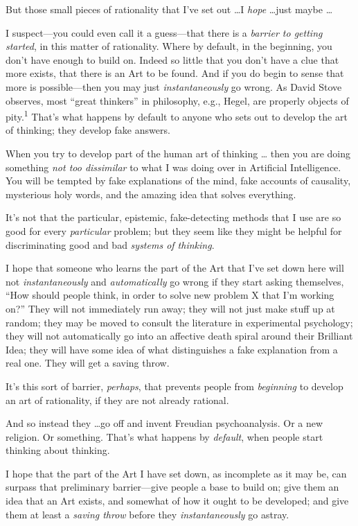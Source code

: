 {
 But those small pieces of rationality that I've
set out \ldots I \textit{hope} \ldots just maybe \ldots}

{
 I suspect---you could even call it a guess---that there is a
\textit{barrier to getting started}, in this matter of rationality.
Where by default, in the beginning, you don't have
enough to build on. Indeed so little that you don't
have a clue that more exists, that there is an Art to be found. And if
you do begin to sense that more is possible---then you may just
\textit{instantaneously} go wrong. As David Stove observes, most
``great thinkers'' in philosophy,
e.g., Hegel, are properly objects of pity.\textsuperscript{1}
That's what happens by default to anyone who sets out
to develop the art of thinking; they develop fake answers.}

{
 When you try to develop part of the human art of thinking \ldots
then you are doing something \textit{not too dissimilar} to what I was
doing over in Artificial Intelligence. You will be tempted by fake
explanations of the mind, fake accounts of causality, mysterious holy
words, and the amazing idea that solves everything.}

{
 It's not that the particular, epistemic,
fake-detecting methods that I use are so good for every
\textit{particular} problem; but they seem like they might be helpful
for discriminating good and bad \textit{systems of thinking}.}

{
 I hope that someone who learns the part of the Art that
I've set down here will not \textit{instantaneously}
and \textit{automatically} go wrong if they start asking themselves,
``How should people think, in order to solve new
problem X that I'm working on?'' They
will not immediately run away; they will not just make stuff up at
random; they may be moved to consult the literature in experimental
psychology; they will not automatically go into an affective death
spiral around their Brilliant Idea; they will have some idea of what
distinguishes a fake explanation from a real one. They will get a
saving throw.}

{
 It's this sort of barrier, \textit{perhaps}, that
prevents people from \textit{beginning} to develop an art of
rationality, if they are not already rational.}

{
 And so instead they \ldots go off and invent Freudian
psychoanalysis. Or a new religion. Or something. That's
what happens by \textit{default}, when people start thinking about
thinking.}

{
 I hope that the part of the Art I have set down, as incomplete as
it may be, can surpass that preliminary barrier---give people a base to
build on; give them an idea that an Art exists, and somewhat of how it
ought to be developed; and give them at least a \textit{saving throw}
before they \textit{instantaneously} go astray.}

